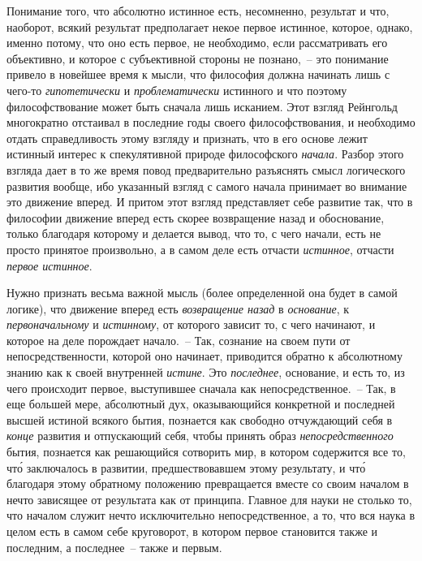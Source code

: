 Понимание того, что абсолютно истинное есть, несомненно,
результат и что, наоборот, всякий результат
предполагает некое первое истинное, которое, однако,
именно потому, что оно есть первое, не необходимо, если
рассматривать его объективно, и которое с субъективной
стороны не познано,~-- это понимание привело в новейшее
время к мысли, что философия должна начинать
лишь с чего-то \emph{гипотетически} и \emph{проблематически} истинного
и что поэтому философствование может быть сначала
лишь исканием. Этот взгляд Рейнгольд многократно
отстаивал в последние годы своего философствования, и
необходимо отдать справедливость этому взгляду и признать,
что в его основе лежит истинный интерес к спекулятивной
природе философского \emph{начала}. Разбор этого
взгляда дает в то же время повод предварительно разъяснять
смысл логического развития вообще, ибо указанный
взгляд с самого начала принимает во внимание это
движение вперед. И притом этот взгляд представляет
себе развитие так, что в философии движение вперед
есть скорее возвращение назад и обоснование, только благодаря
которому и делается вывод, что то, с чего начали,
есть не просто принятое произвольно, а в самом деле
есть отчасти \emph{истинное}, отчасти \emph{первое истинное}.

Нужно признать весьма важной мысль (более определенной
она будет в самой логике), что движение вперед
есть \emph{возвращение назад} в \emph{основание}, к \emph{первоначальному}
и \emph{истинному}, от которого зависит то, с чего начинают,
и которое на деле порождает начало.~-- Так, сознание
на своем пути от непосредственности, которой оно
начинает, приводится обратно к абсолютному знанию
как к своей внутренней \emph{истине}. Это \emph{последнее}, основание,
и есть то, из чего происходит первое, выступившее
сначала как непосредственное.~-- Так, в еще большей
мере, абсолютный дух, оказывающийся конкретной и последней
высшей истиной всякого бытия, познается как
свободно отчуждающий себя в \emph{конце} развития и отпускающий
себя, чтобы принять образ \emph{непосредственного}
бытия, познается как решающийся сотворить мир, в котором
содержится все то, чт\'о заключалось в развитии,
предшествовавшем этому результату, и чт\'о благодаря
этому обратному положению превращается вместе со
своим началом в нечто зависящее от результата как от
принципа. Главное для науки не столько то, что началом
служит нечто исключительно непосредственное, а то, что
вся наука в целом есть в самом себе круговорот, в котором
первое становится также и последним, а последнее~--
также и первым.


